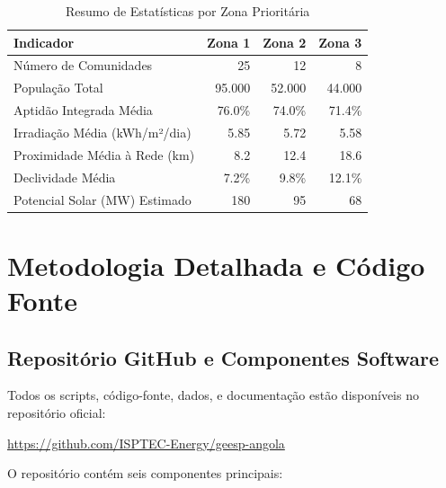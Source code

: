 \documentclass[12pt, a4paper]{article}
\begin{document}
\begin{table}[H]
\centering
\caption{Resumo de Estatísticas por Zona Prioritária}
\label{tab:zone_stats}
\begin{tabular}{|l|r|r|r|}
\hline
\textbf{Indicador} & \textbf{Zona 1} & \textbf{Zona 2} & \textbf{Zona 3} \\
\hline
Número de Comunidades & 25 & 12 & 8 \\
População Total & 95.000 & 52.000 & 44.000 \\
Aptidão Integrada Média & 76.0\% & 74.0\% & 71.4\% \\
Irradiação Média (kWh/m²/dia) & 5.85 & 5.72 & 5.58 \\
Proximidade Média à Rede (km) & 8.2 & 12.4 & 18.6 \\
Declividade Média & 7.2\% & 9.8\% & 12.1\% \\
Potencial Solar (MW) Estimado & 180 & 95 & 68 \\
\hline
\end{tabular}
\end{table}

\section{Metodologia Detalhada e Código Fonte}

\subsection{Repositório GitHub e Componentes Software}

Todos os scripts, código-fonte, dados, e documentação estão disponíveis no repositório oficial:

\begin{center}
\url{https://github.com/ISPTEC-Energy/geesp-angola}
\end{center}

O repositório contém seis componentes principais:
\end{document}

